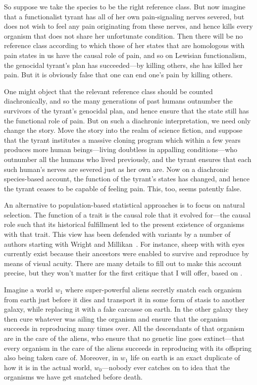 So suppose we take the species to be the right reference class. But now imagine that a functionalist tyrant has 
all of her own pain-signaling nerves severed, but does not wish to feel any pain originating from these nerves, and hence 
kills every organism that does not share  her unfortunate condition. Then there will be no reference 
class according to which those of her states that are homologous with pain states in us have the causal role of pain, and so on Lewisian functionalism, the genocidal tyrant's plan has succeeded---by killing others, she has killed her pain.
But it is obviously false that one can end one's pain by killing others.

One might object that the relevant reference class should be counted diachronically, and so the many generations of 
past humans outnumber the survivors of the tyrant's genocidal plan, and hence ensure that the state still has the 
functional role of pain. But on such a diachronic interpretation, we need only change the story. Move the story into
the realm of science fiction, and suppose that the tyrant institutes a massive cloning program which within a few 
years produces more human beings---living doubtless in appalling conditions---who outnumber all the humans who lived
previously, and the tyrant ensures that each such human's nerves are severed just as her own are. Now on a diachronic
species-based account, the function of the tyrant's states has changed, and hence the tyrant ceases to be capable of 
feeling pain. This, too, seems patently false.

An alternative to population-based statistical approaches is to focus on natural selection. The function of a trait is the
causal role that it evolved for---the causal role such that its historical fulfillment led to the present 
existence of organisms with that trait. This view has been defended with variants by a number of authors starting with
Wright and Millikan~\parencite{Wright1973,Millikan1984,Sterelny1990,Neander1991,Agar1993,Papineau1993,Dretske1995}. For instance, sheep with with eyes currently exist because their ancestors 
were enabled to survive and reproduce by means of visual acuity. There are many details to fill out 
to make this account precise, but they won't matter for the first critique that I will offer, based on .  

Imagine a world $w_1$ where super-powerful aliens secretly snatch each organism from earth just before it dies and transport it in
some form of stasis to another galaxy, while replacing it with a fake carcasse on earth. In the other galaxy they then 
cure whatever 
was ailing the organism and ensure that the organism succeeds in reproducing many times over. All the descendants of that 
organism are in the care of the aliens, who ensure that no genetic line goes extinct---that every organism in 
the care of the aliens succeeds in reproducing with its offspring also being taken care of. Moreover, in $w_1$
life on earth is an exact duplicate of how it is in the actual world, $w_0$---nobody ever catches on to idea that the organisms we 
have get snatched before death.

